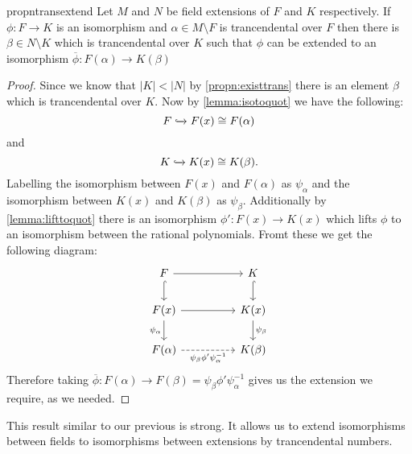 \begin{restatable}{propn}{transextend}
  Let $M$ and $N$ be field extensions of $F$ and $K$ respectively.
  If $\phi: F \to K$ is an isomorphism and $\alpha \in M \setminus F$ 
  is trancendental over $F$ then there is $\beta \in N \setminus K$ which is
  trancendental over $K$ such that $\phi$ can be extended to an isomorphism 
  $\overline{\phi}: F(\alpha) \to K(\beta)$
\end{restatable}
\begin{proof}
  Since we know that $|K| < |N|$ by \cref{propn:existtrans} there is an
  element $\beta$ which is trancendental over $K$. Now by
  \cref{lemma:isotoquot} we have the following:
  \[
    F \xhookrightarrow{} F(x) \cong F(\alpha)
  \] 
  and
  \[
    K \xhookrightarrow{} K(x) \cong K(\beta)
  .\] 
  Labelling the isomorphism between $F(x)$ and $F(\alpha)$ as $\psi_{\alpha}$ 
  and the isomorphism between $K(x)$ and $K(\beta)$ as $\psi_{\beta}$.
  Additionally by \cref{lemma:lifttoquot} there is an isomorphism $\phi':
  F(x) \to K(x)$ which lifts $\phi$ to an isomorphism between the rational
  polynomials. Fromt these we get the following diagram:
  \begin{equation}
  \begin{tikzcd}
    F  \arrow[rr] \arrow[d, hook] & & K \arrow[d, hook] \\
    F(x) \arrow[rr] \arrow[d, "\psi_{\alpha}"']& & K(x) 
                                        \arrow[d, "\psi_{\beta}"]
    \\
    F(\alpha) \arrow[rr, dashed, "\psi_{\beta}\phi'\psi_{\alpha}^{-1}"'] 
                                              & & K(\beta)
  \end{tikzcd}
  \end{equation}
  Therefore taking $\overline{\phi}: F(\alpha) \to F(\beta)
  = \psi_{\beta}\phi'\psi_{\alpha}^{-1}$ gives us the extension we require, as
  we needed.
\end{proof}

This result similar to our previous is strong. It allows us to extend
isomorphisms between fields to isomorphisms between extensions by trancendental
numbers. 
